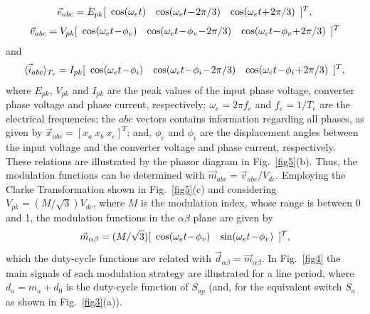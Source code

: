 \documentclass[10pt, onecolumn,conference]{IEEEtran}
\begin{document}
%
\begin{equation}
\vec{e}_{abc}=E_{pk}[ \begin{array}{ c c c} \cos(\omega_e t) &\cos(\omega_e t\!-\!2\pi/3) &\cos(\omega_e t\!+\!2\pi/3) \end{array} ]^T,
\end{equation}
%
\begin{equation}
\vec{v}_{abc}=V_{pk}[\begin{array}{c c c}\cos(\omega_e t\!-\!\phi_v) &\cos(\omega_e t\!-\!\phi_v\!-\!2\pi/3) &\cos(\omega_e t\!-\!\phi_v\!+\!2\pi/3)\end{array}]^T
\end{equation} and
%
\begin{equation}
 \langle\vec{ i} _{abc}\rangle _{T_s} =I_{pk}[\begin{array}{c c c}\cos(\omega_e t\!-\!\phi_i) &\cos(\omega_e t\!-\!\phi_i\!-\!2\pi/3) &\cos(\omega_e t\!-\!\phi_i\!+\!2\pi/3)\end{array}]^T,
\end{equation} where $E_{pk}$, $V_{pk}$ and $I_{pk}$ are the  peak values of the input phase voltage, converter phase voltage and phase current, respectively; $\omega_e\!=\!2\pi f_e$ and $f_e\!=\!1/T_e$ are the electrical frequencies; the $abc$ vectors contains information regarding all phases, as given by $\vec{x}_{abc}\!=\![x_a\ x_b\ x_c]^T$; and, $\phi_v$ and $\phi_i$ are the {displacement angles} between the input voltage and the converter voltage and phase current, respectively. These relations are illustrated by the phasor diagram in Fig.~\ref{fig5}(b). Thus, the modulation functions can be determined with $\vec{m}_{abc}\!=\!\vec{v}_{abc}/V_{dc}$. Employing the Clarke Transformation shown in Fig.~\ref{fig5}(c) and considering $V_{pk}=(M/\sqrt{3})V_{dc}$, where  $M$ is the modulation index, whose range is between 0 and 1, the modulation functions in the $\alpha\beta$ plane are given by
%
\begin{equation}
\vec{m}_{\alpha\beta}=(M/\sqrt{3})[\begin{array}{c c}\cos(\omega_e t\!-\!\phi_v) &\sin(\omega_e t\!-\!\phi_v)\end{array}]^T,
\end{equation} which the duty-cycle functions are related with $\vec{d}_{\alpha\beta}\!=\!\vec{m}_{\alpha\beta}$. In Fig.~\ref{fig4} the main signals of each modulation strategy are illustrated for a line period, where $d_a\!=\!m_a\!+\!d_0$ is the duty-cycle function of $S_{ap}$ (and, for the equivalent switch $S_a$ as shown in Fig.~\ref{fig3}(a)).
\end{document}
